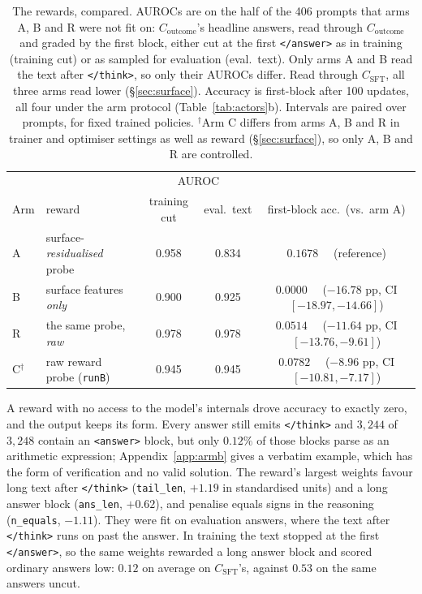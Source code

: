 \documentclass{article}
\begin{document}
\begin{table}[h]
\centering\small
\setlength{\tabcolsep}{4pt}
\begin{tabular}{llccc}
\toprule
 & & \multicolumn{2}{c}{AUROC} & \\
Arm & reward & training cut & eval.\ text & first-block acc.\ (vs.\ arm A) \\
\midrule
A & surface-\emph{residualised} probe & 0.958 & 0.834 & $0.1678$ \ \ (reference) \\
B & surface features \emph{only} & 0.900 & 0.925 & $\mathbf{0.0000}$ \ \ ($-16.78$ pp, CI $[-18.97,-14.66]$) \\
R & the same probe, \emph{raw} & 0.978 & 0.978 & $0.0514$ \ \ ($-11.64$ pp, CI $[-13.76,-9.61]$) \\
\midrule
C$^{\dagger}$ & raw reward probe (\texttt{runB}) & 0.945 & 0.945 & $0.0782$ \ \ ($-8.96$ pp, CI $[-10.81,-7.17]$) \\
\bottomrule
\end{tabular}
\caption{The rewards, compared. AUROCs are on the half of the 406 prompts that arms A, B and R were not fit on: $C_{\text{outcome}}$'s headline answers, read through $C_{\text{outcome}}$ and graded by the first block, either cut at the first \texttt{</answer>} as in training (training cut) or as sampled for evaluation (eval.\ text). Only arms A and B read the text after \texttt{</think>}, so only their AUROCs differ. Read through $C_{\text{SFT}}$, all three arms read lower (\S\ref{sec:surface}). Accuracy is first-block after 100 updates, all four under the arm protocol (Table~\ref{tab:actors}b). Intervals are paired over prompts, for fixed trained policies. $^{\dagger}$Arm C differs from arms A, B and R in trainer and optimiser settings as well as reward (\S\ref{sec:surface}), so only A, B and R are controlled.}
\label{tab:arms}
\end{table}

A reward with no access to the model's internals drove accuracy to exactly zero, and the output keeps its form. Every answer still emits \texttt{</think>} and $3{,}244$ of $3{,}248$ contain an \texttt{<answer>} block, but only $0.12\%$ of those blocks parse as an arithmetic expression; Appendix~\ref{app:armb} gives a verbatim example, which has the form of verification and no valid solution. The reward's largest weights favour long text after \texttt{</think>} (\texttt{tail\_len}, $+1.19$ in standardised units) and a long answer block (\texttt{ans\_len}, $+0.62$), and penalise equals signs in the reasoning (\texttt{n\_equals}, $-1.11$). They were fit on evaluation answers, where the text after \texttt{</think>} runs on past the answer. In training the text stopped at the first \texttt{</answer>}, so the same weights rewarded a long answer block and scored ordinary answers low: $0.12$ on average on $C_{\text{SFT}}$'s, against $0.53$ on the same answers uncut.
\end{document}
